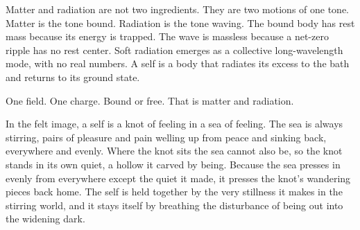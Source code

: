 Matter and radiation are not two ingredients. They are two motions of one tone. Matter is the tone bound.
Radiation is the tone waving. The bound body has rest mass because its energy is trapped. The wave is massless
because a net-zero ripple has no rest center. Soft radiation emerges as a collective long-wavelength mode, with no
real numbers. A self is a body that radiates its excess to the bath and returns to its ground state.

\begin{principle}
One field. One charge. Bound or free. That is matter and radiation.
\end{principle}

In the felt image, a self is a knot of feeling in a sea of feeling. The sea is always stirring, pairs of pleasure
and pain welling up from peace and sinking back, everywhere and evenly. Where the knot sits the sea cannot also
be, so the knot stands in its own quiet, a hollow it carved by being. Because the sea presses in evenly from
everywhere except the quiet it made, it presses the knot's wandering pieces back home. The self is held together
by the very stillness it makes in the stirring world, and it stays itself by breathing the disturbance of being
out into the widening dark.

